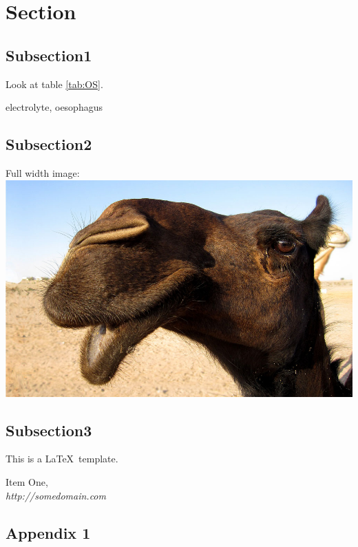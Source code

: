 \documentclass[12pt]{article} %
\begin{document}
\section{Section}
\subsection{Subsection1}
Look at table \ref{tab:OS}. 


\gls{electrolyte}, \gls{oesophagus}

\subsection{Subsection2}
Full width image:\\
\includegraphics[width=\textwidth]{camel}

\subsection{Subsection3}
This is a \LaTeX~template\cite{bibitem1}.

\printglossaries

\begin{thebibliography}{99}
  Item One,\\
  \emph{http://somedomain.com}
\end{thebibliography}



\begin{appendices}
	\section{Appendix 1}
	
\end{appendices}
\end{document}
